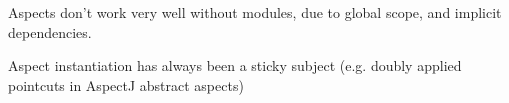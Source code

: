 Aspects don't work very well without modules, due to global scope, and
implicit dependencies.

Aspect instantiation has always been a sticky subject (e.g. doubly applied
pointcuts in AspectJ abstract aspects)

